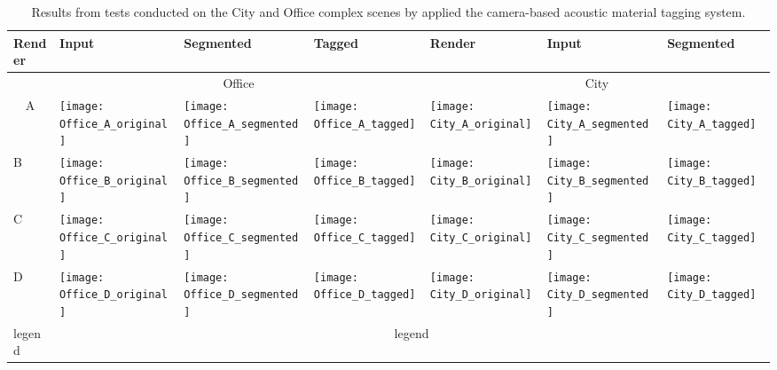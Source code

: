 \begin{landscape}
\begin{table}[]
\def\cogimsw{0.19\textwidth}
\centering
\caption{Results from tests conducted on the City and Office complex scenes by applied the camera-based acoustic material tagging system.}
\begin{tabular}{@{}lllllll@{}}
\toprule
Render & Input & Segmented & Tagged & Render & Input & Segmented \\ \midrule
\multicolumn{1}{c}{}  & \multicolumn{3}{c}{Office} & \multicolumn{3}{c}{City} \\
\multicolumn{1}{c}{A} &  \texttt{[image: Office\_A\_original]} & \texttt{[image: Office\_A\_segmented]} & \texttt{[image: Office\_A\_tagged]} & \texttt{[image: City\_A\_original]} & \texttt{[image: City\_A\_segmented]} & \texttt{[image: City\_A\_tagged]} \\
B & \texttt{[image: Office\_B\_original]} & \texttt{[image: Office\_B\_segmented]} & \texttt{[image: Office\_B\_tagged]} & \texttt{[image: City\_B\_original]} & \texttt{[image: City\_B\_segmented]} & \texttt{[image: City\_B\_tagged]} \\
C & \texttt{[image: Office\_C\_original]} & \texttt{[image: Office\_C\_segmented]} & \texttt{[image: Office\_C\_tagged]} & \texttt{[image: City\_C\_original]} & \texttt{[image: City\_C\_segmented]} & \texttt{[image: City\_C\_tagged]} \\
D & \texttt{[image: Office\_D\_original]} & \texttt{[image: Office\_D\_segmented]} & \texttt{[image: Office\_D\_tagged]} & \texttt{[image: City\_D\_original]} & \texttt{[image: City\_D\_segmented]} & \texttt{[image: City\_D\_tagged]} \\
\multicolumn{1}{l}{legend} & \multicolumn{6}{c}{legend}
\end{tabular}
\label{tab:cog-preliminary-results}
\end{table}
\end{landscape}